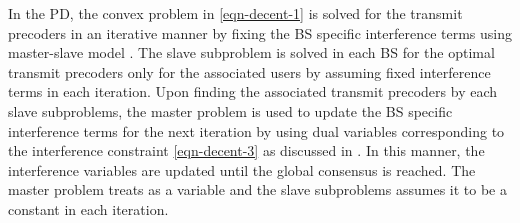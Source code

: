 In the \acl{PD}, the convex problem in \eqref{eqn-decent-1} is solved for the transmit precoders in an iterative manner by fixing the \ac{BS} specific interference terms  using master-slave model \cite{pennanen2011decentralized}. The slave subproblem is solved in each \ac{BS} for the optimal transmit precoders only for the associated users by assuming fixed interference terms  in each  iteration. Upon finding the associated transmit precoders by each slave subproblems, the master problem is used to update the \ac{BS} specific interference terms  for the next iteration by using dual variables corresponding to the interference constraint \eqref{eqn-decent-3} as discussed in \cite{pennanen2011decentralized}. In this manner, the interference variables are updated until the global consensus is reached. The master problem treats  as a variable and the slave subproblems assumes it to be a constant in each iteration.
\begin{comment}
The \acl{PD} approach decomposes the problem by fixing the interference variables \me{\zeta_{l,k,n,b} \forall k,b} in order to perform the precoder design independently across each \ac{BS}. Once the optimal precoders are designed at each \ac{BS} with the fixed interference constraints \eqref{eqn-decent-3}, the dual variables corresponding to the interference constraints are exchanged between the cooperating \acp{BS} in \me{\mc{B}} to update the interference variables \me{\zeta_{l,k,n,b}} for the next iteration until convergence. The primal approach is discussed extensively for the min-power problem in \cite{pennanen2011decentralized} and much of the current work follows similar approach. 
\subsubsection*{Convergence}
The convergence of the primal decomposition is similar to that of the centralized problem if the interference variables \me{\zeta_{l,k,n,b}} are allowed to converge to a stationary point. In practice, we can limit the number of exchanges to \me{J_{\max}} after which the \ac{SCA} update is performed until convergence or for \me{I_{\max}} times. The update of \me{\tilde{p}_{l,k,n}, \tilde{q}_{l,k,n}} and \me{\tilde{\beta}_{l,k,n}} can be made in conjunction with the receiver update \me{\mvec{W}{k,n}}. The receiver update can be made by using the precoded pilot transmission from each user as in \cite{komulainen2013effective}. 
\end{comment}